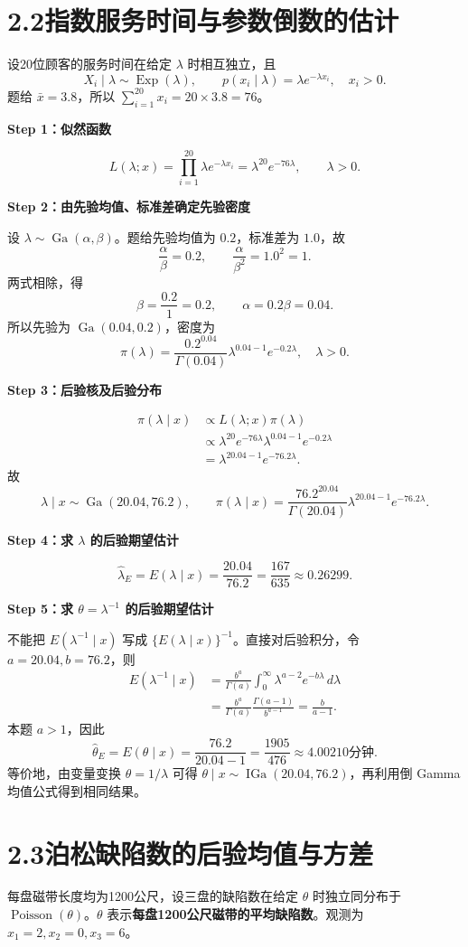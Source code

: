 \documentclass[UTF8,zihao=-4]{ctexart}
\newcommand{\step}[1]{\par\medskip\noindent\textbf{#1}\par\nopagebreak}
\newcommand{\Ga}{\operatorname{Ga}}
\newcommand{\IGa}{\operatorname{IGa}}
\begin{document}
\section*{2.2\quad 指数服务时间与参数倒数的估计}
设20位顾客的服务时间在给定 $\lambda$ 时相互独立，且
\[
X_i\mid\lambda\sim\operatorname{Exp}(\lambda),\qquad
p(x_i\mid\lambda)=\lambda e^{-\lambda x_i},\quad x_i>0.
\]
题给 $\bar x=3.8$，所以 $\sum_{i=1}^{20}x_i=20\times3.8=76$。

\step{Step 1：似然函数}
\[
L(\lambda;x)=\prod_{i=1}^{20}\lambda e^{-\lambda x_i}
=\lambda^{20}e^{-76\lambda},\qquad\lambda>0.
\]

\step{Step 2：由先验均值、标准差确定先验密度}
设 $\lambda\sim\Ga(\alpha,\beta)$。题给先验均值为 $0.2$，标准差为 $1.0$，故
\[
\frac\alpha\beta=0.2,\qquad\frac\alpha{\beta^2}=1.0^2=1.
\]
两式相除，得
\[
\beta=\frac{0.2}{1}=0.2,\qquad\alpha=0.2\beta=0.04.
\]
所以先验为 $\Ga(0.04,0.2)$，密度为
\[
\pi(\lambda)=\frac{0.2^{0.04}}{\Gamma(0.04)}
\lambda^{0.04-1}e^{-0.2\lambda},\quad\lambda>0.
\]

\step{Step 3：后验核及后验分布}
\begin{align*}
\pi(\lambda\mid x)
&\propto L(\lambda;x)\pi(\lambda)\\
&\propto\lambda^{20}e^{-76\lambda}\lambda^{0.04-1}e^{-0.2\lambda}\\
&=\lambda^{20.04-1}e^{-76.2\lambda}.
\end{align*}
故
\[
\boxed{\lambda\mid x\sim\Ga(20.04,76.2),}
\qquad
\pi(\lambda\mid x)=\frac{76.2^{20.04}}{\Gamma(20.04)}
\lambda^{20.04-1}e^{-76.2\lambda}.
\]

\step{Step 4：求 $\lambda$ 的后验期望估计}
\[
\boxed{\hat\lambda_E=E(\lambda\mid x)=\frac{20.04}{76.2}
=\frac{167}{635}\approx0.26299.}
\]

\step{Step 5：求 $\theta=\lambda^{-1}$ 的后验期望估计}
不能把 $E(\lambda^{-1}\mid x)$ 写成 $\{E(\lambda\mid x)\}^{-1}$。直接对后验积分，令 $a=20.04,b=76.2$，则
\begin{align*}
E(\lambda^{-1}\mid x)
&=\frac{b^a}{\Gamma(a)}\int_0^\infty
\lambda^{a-2}e^{-b\lambda}\,d\lambda\\
&=\frac{b^a}{\Gamma(a)}\frac{\Gamma(a-1)}{b^{a-1}}
=\frac b{a-1}.
\end{align*}
本题 $a>1$，因此
\[
\boxed{\hat\theta_E=E(\theta\mid x)=\frac{76.2}{20.04-1}
=\frac{1905}{476}\approx4.00210\text{分钟}.}
\]
等价地，由变量变换 $\theta=1/\lambda$ 可得
$\theta\mid x\sim\IGa(20.04,76.2)$，再利用倒 Gamma 均值公式得到相同结果。

\section*{2.3\quad 泊松缺陷数的后验均值与方差}
每盘磁带长度均为1200公尺，设三盘的缺陷数在给定 $\theta$ 时独立同分布于 $\operatorname{Poisson}(\theta)$。$\theta$ 表示\textbf{每盘1200公尺磁带的平均缺陷数}。观测为 $x_1=2,x_2=0,x_3=6$。
\end{document}
